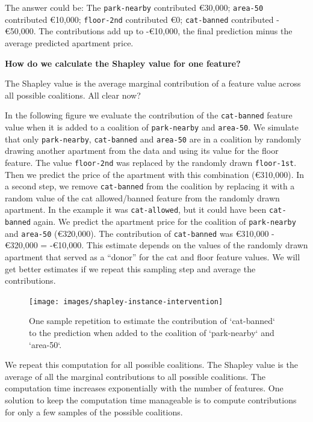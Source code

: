 \documentclass[
  12pt,
]{krantz}
\begin{document}
The answer could be:
The \texttt{park-nearby} contributed €30,000; \texttt{area-50} contributed €10,000; \texttt{floor-2nd} contributed €0; \texttt{cat-banned} contributed -€50,000.
The contributions add up to -€10,000, the final prediction minus the average predicted apartment price.

\textbf{How do we calculate the Shapley value for one feature?}

The Shapley value is the average marginal contribution of a feature value across all possible coalitions.
All clear now?

In the following figure we evaluate the contribution of the \texttt{cat-banned} feature value when it is added to a coalition of \texttt{park-nearby} and \texttt{area-50}.
We simulate that only \texttt{park-nearby}, \texttt{cat-banned} and \texttt{area-50} are in a coalition by randomly drawing another apartment from the data and using its value for the floor feature.
The value \texttt{floor-2nd} was replaced by the randomly drawn \texttt{floor-1st}.
Then we predict the price of the apartment with this combination (€310,000).
In a second step, we remove \texttt{cat-banned} from the coalition by replacing it with a random value of the cat allowed/banned feature from the randomly drawn apartment.
In the example it was \texttt{cat-allowed}, but it could have been \texttt{cat-banned} again.
We predict the apartment price for the coalition of \texttt{park-nearby} and \texttt{area-50} (€320,000).
The contribution of \texttt{cat-banned} was €310,000 - €320,000 = -€10,000.
This estimate depends on the values of the randomly drawn apartment that served as a ``donor'' for the cat and floor feature values.
We will get better estimates if we repeat this sampling step and average the contributions.

\begin{figure}

{\centering \texttt{[image: images/shapley-instance-intervention]} 

}

\caption{One sample repetition to estimate the contribution of `cat-banned` to the prediction when added to the coalition of `park-nearby` and `area-50`.}\label{fig:shapley-instance-intervened}
\end{figure}

We repeat this computation for all possible coalitions.
The Shapley value is the average of all the marginal contributions to all possible coalitions.
The computation time increases exponentially with the number of features.
One solution to keep the computation time manageable is to compute contributions for only a few samples of the possible coalitions.
\end{document}
